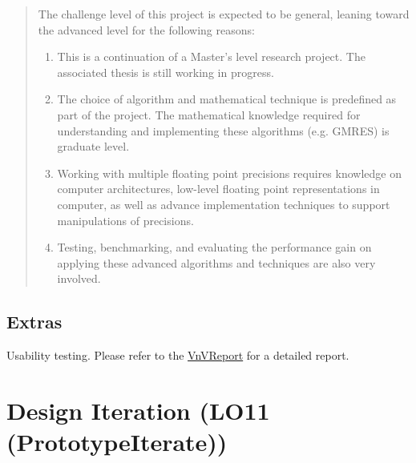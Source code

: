 \documentclass{article}
\begin{document}
\begin{quote}
  The challenge level of this project is expected to be general, leaning toward
  the advanced level for the following reasons:
  \begin{enumerate}
  \item This is a continuation of a Master's level research project. The
    associated thesis is still working in progress.
  \item The choice of algorithm and mathematical technique is predefined as part
    of the project. The mathematical knowledge required for understanding and
    implementing these algorithms (e.g. GMRES) is graduate level.
  \item Working with multiple floating point precisions requires knowledge on
    computer architectures, low-level floating point representations in
    computer, as well as advance implementation techniques to support
    manipulations of precisions.
  \item Testing, benchmarking, and evaluating the performance gain on applying
    these advanced algorithms and techniques are also very involved.
  \end{enumerate}
\end{quote}

\subsection{Extras}


Usability testing. Please refer to the
\href{https://github.com/yex33/MPIR/blob/main/docs/VnVReport/VnVReport.pdf}{VnVReport}
for a detailed report.

\section{Design Iteration (LO11 (PrototypeIterate))}


\end{document}
